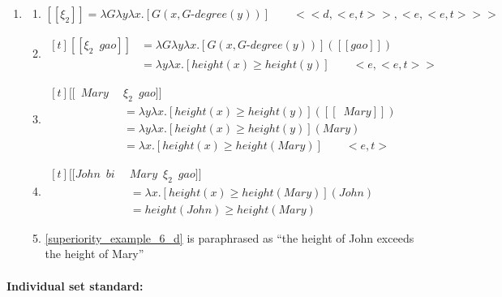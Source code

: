 \documentclass{ctexart}
\begin{document}
\begin{enumerate}
    \item \label{superiority_example_6}
    \begin{enumerate}
        \item \label{superiority_example_6_a}
        $[\![\xi_2]\!] = \lambda G \lambda y \lambda x.[G(x,G \mbox{-} degree(y))] \qquad <<d,<e,t>>,<e,<e,t>>>$

        \item \label{superiority_example_6_b}
        $\begin{aligned}[t]
            [\![\xi_2 \enspace gao]\!] 
            &= \lambda G \lambda y \lambda x.[G(x,G\mbox{-}degree(y))]([\![gao]\!]) \\
            &= \lambda y \lambda x.[height(x) \geq height(y)] \qquad <e,<e,t>>
        \end{aligned}$

        \item \label{superiority_example_6_c}
        $\begin{aligned}[t]
            [\![\enspace Mary \enspace & \xi_2 \enspace gao]\!] \\
            &= \lambda y \lambda x.[height(x) \geq height(y)]([\![\enspace Mary]\!]) \\
            &= \lambda y \lambda x.[height(x) \geq height(y)](Mary) \\
            &= \lambda x.[height(x) \geq height(Mary)] \qquad <e,t>
        \end{aligned}$

        \item \label{superiority_example_6_d}
        $\begin{aligned}[t]
            [\![John \enspace bi \enspace & Mary \enspace \xi_2 \enspace gao]\!] \\
            &= \lambda x.[height(x) \geq height(Mary)](John) \\
            &= height(John) \geq height(Mary)
        \end{aligned}$

        \item \label{superiority_example_6_e}
        \ref{superiority_example_6_d} is paraphrased as ``the height of John exceeds the height of Mary''

    \end{enumerate}
\end{enumerate}

\paragraph{Individual set standard:}
\end{document}

